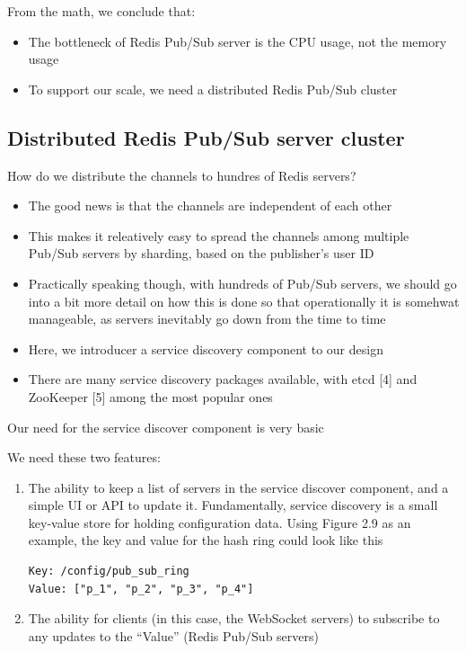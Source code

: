 \documentclass{report}
\theoremstyle{definition}
\let\oldsubsection\subsection
\renewcommand{\subsection}{\oldsubsection*}
\begin{document}
From the math, we conclude that:

\begin{itemize}
\item
The bottleneck of Redis Pub/Sub server is the CPU usage, not the memory usage
\item
To support our scale, we need a distributed Redis Pub/Sub cluster
\end{itemize}

\subsection{Distributed Redis Pub/Sub server cluster}

How do we distribute the channels to hundres of Redis servers?

\begin{itemize}
\item
The good news is that the channels are independent of each other
\item
This makes it releatively easy to spread the channels among multiple Pub/Sub servers by sharding, based on the publisher's user ID
\item
Practically speaking though, with hundreds of Pub/Sub servers, we should go into a bit more detail on how this is done so that operationally it is somehwat manageable, as servers inevitably go down from the time to time
\item
Here, we introducer a service discovery component to our design
\item
There are many service discovery packages available, with etcd [4] and ZooKeeper [5] among the most popular ones
\end{itemize}

Our need for the service discover component is very basic

We need these two features:

\begin{enumerate}
\item

The ability to keep a list of servers in the service discover component, and a simple UI or API to update it. Fundamentally, service discovery is a small key-value store for holding configuration data. Using Figure 2.9 as an example, the key and value for the hash ring could look like this

\begin{lstlisting}
Key: /config/pub_sub_ring
Value: ["p_1", "p_2", "p_3", "p_4"]
\end{lstlisting}

\item
The ability for clients (in this case, the WebSocket servers) to subscribe to any updates to the ``Value'' (Redis Pub/Sub servers)
\end{enumerate}
\end{document}
